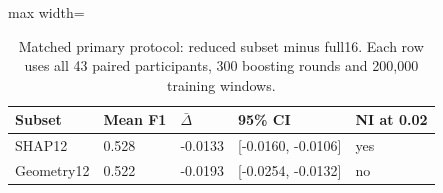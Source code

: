\begin{table}[htbp]
\centering\small
\caption{Matched primary protocol: reduced subset minus full16. Each row uses all 43 paired participants, 300 boosting rounds and 200,000 training windows.}\label{tab:primary}
\begin{adjustbox}{max width=\textwidth}
\begin{tabular}{lllll}\toprule
Subset & Mean F1 & $\bar\Delta$ & 95\% CI & NI at 0.02\\\midrule
SHAP12 & 0.528 & -0.0133 & [-0.0160, -0.0106] & yes\\
Geometry12 & 0.522 & -0.0193 & [-0.0254, -0.0132] & no\\
\bottomrule\end{tabular}
\end{adjustbox}
\end{table}
